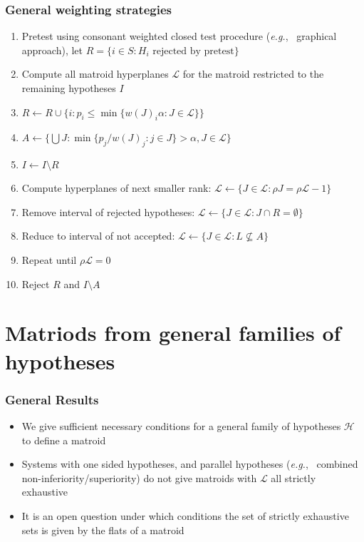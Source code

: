 \documentclass[bigger]{beamer}
\newcommand{\eg}{{\sl e.g.},~}
\begin{document}
\begin{frame}
\frametitle{General weighting strategies}

\begin{enumerate}
\item Pretest using consonant weighted closed test procedure (\eg
  graphical approach), let $R = \{i \in S: H_i \textrm{ rejected by pretest}\}$
\item Compute all matroid hyperplanes $\mathscr{L}$ for the matroid
  restricted to the remaining hypotheses $I$
\item $R \gets R \cup \{i: p_i \leq \min\{ w(J)_{i}\alpha: J \in
  \mathscr{L} \} \}$
\item $A \gets \{\bigcup J: \min\{p_j / w(J)_{j}: j \in J\} > \alpha,
J \in \mathscr{L} \}$
\item $I \gets I \setminus R$
\item Compute hyperplanes of next smaller rank: $\mathscr{L} \gets \{J\in \mathscr{L}: \rho J = \rho
 \mathscr{L} - 1\}$
\item Remove interval of rejected hypotheses: $\mathscr{L} \gets \{J \in \mathscr{L}: J \cap R = \emptyset\}$
\item Reduce to interval of not accepted: $\mathscr{L} \gets \{J \in \mathscr{L}: L \nsubseteq A\}$
\item Repeat until $\rho \mathscr{L} = 0$
\item Reject $R$ and $I \setminus A$
\end{enumerate}
\end{frame}
\section{Matriods from general families of hypotheses}



\begin{frame}
\frametitle{General Results}
\begin{itemize}
\item We give sufficient necessary conditions for a general family of
  hypotheses $\mathscr{H}$ to define a matroid
\item Systems with one sided hypotheses, and parallel hypotheses (\eg
 combined non-inferiority/superiority) do not give matroids with
 $\mathscr{L}$ all strictly exhaustive
\item It is an open question under which conditions the set of
  strictly exhaustive sets is given by the flats of a matroid
\end{itemize}


\end{frame}
\end{document}
